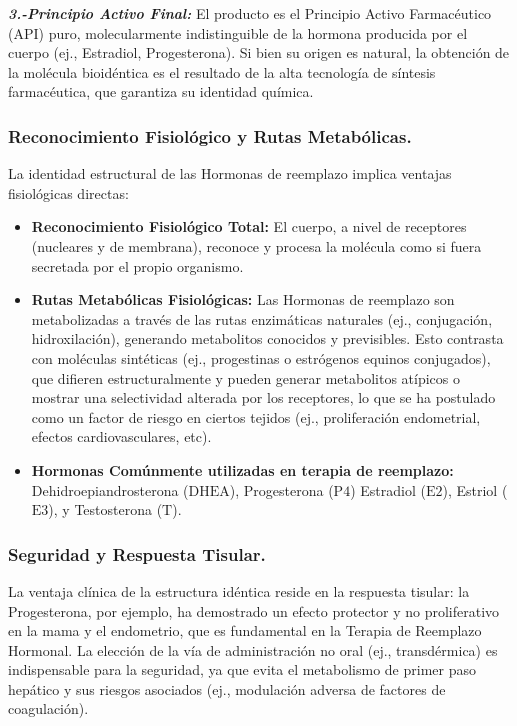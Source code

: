\documentclass[
  spanish,
]{article}
\begin{document}
\textbf{\emph{3.-Principio Activo Final:}} El producto es el Principio Activo Farmacéutico (API) puro, molecularmente indistinguible de la hormona producida por el cuerpo (ej., Estradiol, Progesterona). Si bien su origen es natural, la obtención de la molécula bioidéntica es el resultado de la alta tecnología de síntesis farmacéutica, que garantiza su identidad química.

\subsubsection{Reconocimiento Fisiológico y Rutas Metabólicas.}\label{reconocimiento-fisioluxf3gico-y-rutas-metabuxf3licas.}

La identidad estructural de las Hormonas de reemplazo implica ventajas fisiológicas directas:

\begin{itemize}
\item
  \textbf{Reconocimiento Fisiológico Total:} El cuerpo, a nivel de receptores (nucleares y de membrana), reconoce y procesa la molécula como si fuera secretada por el propio organismo.
\item
  \textbf{Rutas Metabólicas Fisiológicas:} Las Hormonas de reemplazo son metabolizadas a través de las rutas enzimáticas naturales (ej., conjugación, hidroxilación), generando metabolitos conocidos y previsibles. Esto contrasta con moléculas sintéticas (ej., progestinas o estrógenos equinos conjugados), que difieren estructuralmente y pueden generar metabolitos atípicos o mostrar una selectividad alterada por los receptores, lo que se ha postulado como un factor de riesgo en ciertos tejidos (ej., proliferación endometrial, efectos cardiovasculares, etc).
\item
  \textbf{Hormonas Comúnmente utilizadas en terapia de reemplazo:} Dehidroepiandrosterona (\(\text{DHEA}\)), Progesterona (\(\text{P4}\)) Estradiol (\(\text{E2}\)), Estriol (\(\text{E3}\)), y Testosterona (\(\text{T}\)).
\end{itemize}

\subsubsection{Seguridad y Respuesta Tisular.}\label{seguridad-y-respuesta-tisular.}

La ventaja clínica de la estructura idéntica reside en la respuesta tisular: la Progesterona, por ejemplo, ha demostrado un efecto protector y no proliferativo en la mama y el endometrio, que es fundamental en la Terapia de Reemplazo Hormonal. La elección de la vía de administración no oral (ej., transdérmica) es indispensable para la seguridad, ya que evita el metabolismo de primer paso hepático y sus riesgos asociados (ej., modulación adversa de factores de coagulación).
\end{document}
